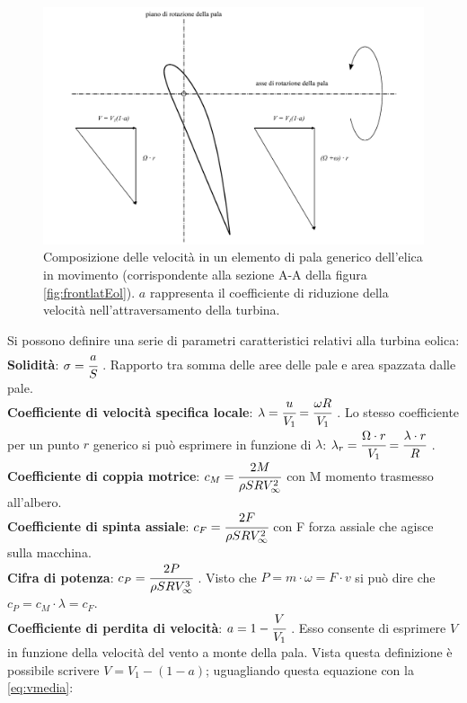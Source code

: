 \begin{figure}
\centering
  \includegraphics[width=\textwidth]{fig/triangEol.pdf}
\caption{Composizione delle velocità in un elemento di pala generico dell'elica in movimento (corrispondente alla sezione A-A della figura \ref{fig:frontlatEol}). $a$ rappresenta il coefficiente di riduzione della velocità nell'attraversamento della turbina.}
\label{fig:triangEol}
\end{figure}
Si possono definire una serie di parametri caratteristici relativi alla turbina eolica:\\[1mm]
\textbf{Solidità}: $\sigma=\cfrac{a}{S}$ . Rapporto tra somma delle aree delle pale e area spazzata dalle pale.\\
\textbf{Coefficiente di velocità specifica locale}:
$\lambda=\cfrac{u}{V_1}=\cfrac{\omega R}{V_1}$ . Lo stesso coefficiente per un punto $r$ generico si può esprimere in funzione di $\lambda$: $\lambda_r = \cfrac{\Omega \cdot r}{V_1} = \cfrac{\lambda \cdot r}{R}$ .\\
\textbf{Coefficiente di coppia motrice}: $c_M=\cfrac{2M}{\rho S R V_\infty^2}$ con M momento trasmesso all'albero.\\
\textbf{Coefficiente di spinta assiale}: $c_F=\cfrac{2F}{\rho S R V_\infty^2}$ con F forza assiale che agisce sulla macchina.\\
\textbf{Cifra di potenza}: $c_P=\cfrac{2P}{\rho S R V_\infty^3}$ . Visto che $P=m\cdot \omega = F \cdot v$ si può dire che $c_P=c_M \cdot \lambda=c_F$.\\
\textbf{Coefficiente di perdita di velocità}: $a=1-\cfrac{V}{V_1}$ . Esso consente di esprimere $V$ in funzione della velocità del vento a monte della pala. Vista questa definizione è possibile scrivere $V=V_1-(1-a)$; uguagliando questa equazione con la \ref{eq:vmedia}:
